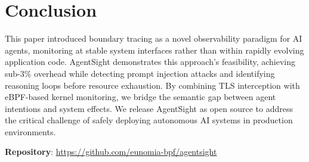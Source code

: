 



\section{Conclusion}

This paper introduced boundary tracing as a novel observability paradigm for AI agents, monitoring at stable system interfaces rather than within rapidly evolving application code. AgentSight demonstrates this approach's feasibility, achieving sub-3\% overhead while detecting prompt injection attacks and identifying reasoning loops before resource exhaustion. By combining TLS interception with eBPF-based kernel monitoring, we bridge the semantic gap between agent intentions and system effects. We release AgentSight as open source to address the critical challenge of safely deploying autonomous AI systems in production environments.

\textbf{Repository}: \url{https://github.com/eunomia-bpf/agentsight}




